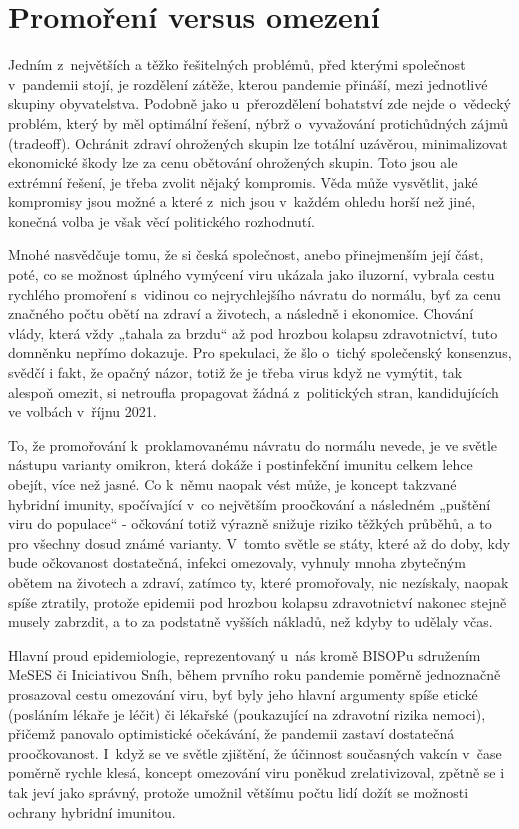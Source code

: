 \section*{Promoření versus omezení}

Jedním z~největších a těžko řešitelných problémů, před kterými společnost v~pandemii stojí, je rozdělení zátěže, kterou pandemie přináší, mezi jednotlivé skupiny obyvatelstva. Podobně jako u~přerozdělení bohatství zde nejde o~vědecký problém, který by měl optimální řešení, nýbrž o~vyvažování protichůdných zájmů (tradeoff). Ochránit zdraví ohrožených skupin lze totální uzávěrou, minimalizovat ekonomické škody lze za cenu obětování ohrožených skupin. Toto jsou ale extrémní řešení, je třeba zvolit nějaký kompromis. Věda může vysvětlit, jaké kompromisy jsou možné a které z~nich jsou v~každém ohledu horší než jiné, konečná volba je však věcí politického rozhodnutí. 

Mnohé nasvědčuje tomu, že si česká společnost, anebo přinejmenším její část, poté, co se možnost úplného vymýcení viru ukázala jako iluzorní, vybrala cestu rychlého promoření s~vidinou co nejrychlejšího návratu do normálu, byť za cenu značného počtu obětí na zdraví a životech, a následně i ekonomice. Chování vlády, která vždy „tahala za brzdu“ až pod hrozbou kolapsu zdravotnictví, tuto domněnku nepřímo dokazuje. Pro spekulaci, že šlo o~tichý společenský konsenzus, svědčí i fakt, že opačný názor, totiž že je třeba virus když ne vymýtit, tak alespoň omezit, si netroufla propagovat žádná z~politických stran, kandidujících ve volbách v~říjnu 2021. 

To, že promořování k~proklamovanému návratu do normálu nevede, je ve světle nástupu varianty omikron, která dokáže i postinfekční imunitu celkem lehce obejít, více než jasné. Co k~němu naopak vést může, je koncept takzvané hybridní imunity, spočívající v~co největším proočkování a následném „puštění viru do populace“ - očkování totiž výrazně snižuje riziko těžkých průběhů, a to pro všechny dosud známé varianty. V~tomto světle se státy, které až do doby, kdy bude očkovanost dostatečná, infekci omezovaly, vyhnuly mnoha zbytečným obětem na životech a zdraví, zatímco ty, které promořovaly, nic nezískaly, naopak spíše ztratily,  protože epidemii pod hrozbou kolapsu zdravotnictví nakonec stejně musely zabrzdit, a to za podstatně vyšších nákladů, než kdyby to udělaly včas.

Hlavní proud epidemiologie, reprezentovaný u~nás kromě BISOPu sdružením MeSES či Iniciativou Sníh, během prvního roku pandemie poměrně jednoznačně prosazoval cestu omezování viru, byť byly jeho hlavní argumenty spíše etické (posláním lékaře je léčit) či lékařské (poukazující na zdravotní rizika nemoci), přičemž panovalo optimistické očekávání, že pandemii zastaví dostatečná proočkovanost. I~když se ve světle zjištění, že účinnost současných vakcín v~čase poměrně rychle klesá, koncept omezování viru  poněkud zrelativizoval, zpětně se i tak jeví jako správný, protože umožnil většímu počtu lidí dožít se možnosti ochrany hybridní imunitou. 

